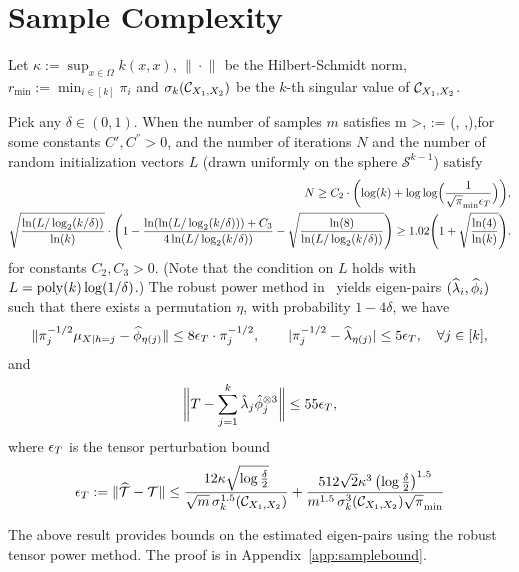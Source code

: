 \section{Sample Complexity}

Let $\kappa:=\sup_{x \in \Omega} k(x,x)$,   $\| \cdot\|_{}$ be the Hilbert-Schmidt norm, $r_{\min}:=\min_{i\in [k]} \pi_i$ and $\sigma_k(\mathcal{C}_{X_1, X_2})$ be the $k$-th singular value of $\mathcal{C}_{X_1, X_2}$.

\begin{theorem}\label{thm:samplebound}
Pick  any $\delta\in (0,1)$. When the number of samples $m$ satisfies
\beq m >,
\quad \rho:= \max\left(, ,\right),\eeq for some constants $C', C^{''}>0$, and the number of iterations $N$  and  the number of random initialization vectors $L$  (drawn uniformly on the sphere $\mathcal{S}^{k-1}$)  satisfy
\begin{align*}
N \geq C_2 \cdot \biggl( \log(k) + \log\log\Bigl(
\frac{1}{\sqrt{\pi}_{\min}\epsilon_T} \Bigr) \biggr),\\
\sqrt{\frac{\ln(L/\log_2(k/\delta))}{\ln(k)}}
\cdot \Biggl( 1 - \frac{\ln(\ln(L/\log_2(k/\delta))) +
C_3}{4\ln(L/\log_2(k/\delta))} -
\sqrt{\frac{\ln(8)}{\ln(L/\log_2(k/\delta))}} \Biggr)
\geq 1.02 \Biggl( 1 + \sqrt{\frac{\ln(4)}{\ln(k)}}
\Biggr)
.
\end{align*}
for constants $C_2,C_3>0$. (Note that the condition on $L$ holds with $L = \operatorname{poly}(k) \log(1/\delta)$.) The robust power method in~\cite{AnandkumarEtal:community12} yields eigen-pairs $(\widehat{\lambda}_i, \widehat{\phi}_i)$ such that there exists a permutation $\eta$, with probability $1-4\delta$, we have
\[
\|\pi^{-1/2}_{j} \mu_{X|h=j}-\widehat{\phi}_{\eta(j)}\| \leq 8 \epsilon_T \cdot\pi^{-1/2}_{j}
, \qquad
|\pi^{-1/2}_{j}-\widehat{\lambda}_{\eta(j)}| \leq  5\epsilon_T, \quad \forall j \in [k]
,
\]
and
\[
\biggl\|
T - \sum_{j=1}^k \hat\lambda_j \hat{\phi}_j^{\otimes 3}
\biggr\| \leq 55\epsilon_T,
\] where $\epsilon_T$ is the tensor perturbation bound
\[ \epsilon_T := \|\widehat{{\mathcal{T}}} - {\mathcal{T}}\| \leq
\frac{12 \kappa \sqrt{\log\frac{\delta}{2}}}{\sqrt{m} \, \sigma_k^{1.5}(\mathcal{C}_{X_1, X_2})} + \frac{512 \sqrt{2} \kappa^3 \left(\log\frac{\delta}{2}\right)^{1.5}}{m^{1.5} \,\sigma_k^{3}(\mathcal{C}_{X_1, X_2}) \sqrt{\pi}_{\min}}\]

\end{theorem}
The above result provides bounds on the estimated eigen-pairs using the robust tensor power method.
The proof is in Appendix~\ref{app:samplebound}.

